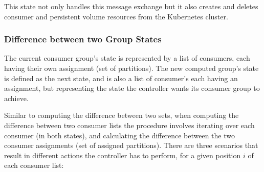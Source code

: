 This state not only handles this message exchange but it also creates and
deletes consumer and persistent volume resources from the Kubernetes cluster. 

\subsubsection{Difference between two Group States}

The current consumer group's state is represented by a list of consumers, each
having their own assignment (set of partitions). The new computed group's state
is defined as the next state, and is also a list of consumer's each having an
assignment, but representing the state the controller wants its consumer group
to achieve.

Similar to computing the difference between two sets, when computing the
difference between two consumer lists the procedure involves iterating over each
consumer (in both states), and calculating the difference between the two consumer
assignments (set of assigned partitions). There are three scenarios that result
in different actions the controller has to perform, for a given position $i$ of
each consumer list: 
